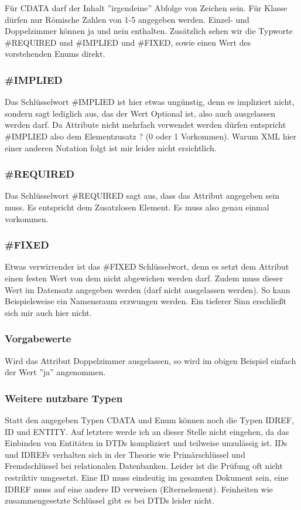 Für CDATA darf der Inhalt ''irgendeine'' Abfolge von Zeichen sein. Für Klasse dürfen nur Römische Zahlen von 1-5 angegeben
werden. Einzel- und Doppelzimmer können ja und nein enthalten. Zusätzlich sehen wir die Typworte \#REQUIRED und
\#IMPLIED und \#FIXED, sowie einen Wert des vorstehenden Enums direkt. 

\subsubsection{\#IMPLIED}
Das Schlüsselwort \#IMPLIED ist hier etwas ungünstig, denn es impliziert nicht, sondern sagt lediglich aus, das der Wert
Optional ist, also auch ausgelassen werden darf. Da Attribute nicht mehrfach verwendet werden dürfen entspricht \#IMPLIED
also dem Elementzusatz ? (0 oder 1 Vorkommen). Warum XML hier einer anderen Notation folgt ist mir leider nicht
ersichtlich.

\subsubsection{\#REQUIRED}
Das Schlüsselwort \#REQUIRED sagt aus, dass das Attribut angegeben sein muss. Es entspricht dem Zusatzlosen Element. Es
muss also genau einmal vorkommen.

\subsubsection{\#FIXED}
Etwas verwirrender ist das \#FIXED Schlüsselwort, denn es setzt dem Attribut einen festen Wert von dem nicht abgewichen
werden darf. Zudem muss dieser Wert im Datensatz angegeben werden (darf nicht ausgelassen werden). So kann
Beispielsweise ein Namensraum erzwungen werden. Ein tieferer Sinn erschließt sich mir auch hier nicht.

\subsubsection{Vorgabewerte}
Wird das Attribut Doppelzimmer ausgelassen, so wird im obigen Beispiel einfach der Wert ''ja'' angenommen.

\subsubsection{Weitere nutzbare Typen}
Statt den angegeben Typen CDATA und Enum können noch die Typen IDREF, ID und ENTITY. Auf letztere werde ich an dieser
Stelle nicht eingehen, da das Einbinden von Entitäten in DTDs kompliziert und teilweise unzulässig ist. IDs und IDREFs
verhalten sich in der Theorie wie Primärschlüssel und Fremdschlüssel bei relationalen Datenbanken. Leider ist die
Prüfung oft nicht restriktiv umgesetzt. Eine ID muss eindeutig im gesamten Dokument sein, eine IDREF muss auf eine
andere ID verweisen (Elternelement). Feinheiten wie zusammengesetzte Schlüssel gibt es bei DTDs leider nicht.


